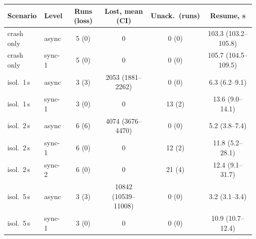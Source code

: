 \begin{tabular}{llcccc}
\toprule
Scenario & Level & Runs (loss) & Lost, mean (CI) & Unack.\ (runs) & Resume, s \\
\midrule
crash only & async & 5 (0) & 0 & 0 (0) & 103.3 (103.2--105.8) \\
crash only & sync-1 & 5 (0) & 0 & 0 (0) & 105.7 (104.5--109.5) \\
isol.\ 1\,s & async & 3 (3) & 2053 (1881--2262) & 0 (0) & 6.3 (6.2--9.1) \\
isol.\ 1\,s & sync-1 & 3 (0) & 0 & 13 (2) & 13.6 (9.0--14.1) \\
isol.\ 2\,s & async & 6 (6) & 4074 (3676--4470) & 0 (0) & 5.2 (3.8--7.4) \\
isol.\ 2\,s & sync-1 & 6 (0) & 0 & 12 (2) & 11.8 (5.2--28.1) \\
isol.\ 2\,s & sync-2 & 6 (0) & 0 & 21 (4) & 12.4 (9.1--31.7) \\
isol.\ 5\,s & async & 3 (3) & 10842 (10539--11008) & 0 (0) & 3.2 (3.1--3.4) \\
isol.\ 5\,s & sync-1 & 3 (0) & 0 & 0 (0) & 10.9 (10.7--12.4) \\
\bottomrule
\end{tabular}
